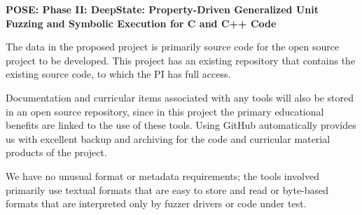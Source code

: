 \documentclass[12pt]{article}
\begin{document}

\begin{center}
  {\Large\sf\textbf{POSE: Phase II: DeepState: Property-Driven Generalized Unit Fuzzing and Symbolic Execution for C and C++ Code}}
\end{center}

The data in the proposed project is primarily source code for the open
source project to be developed.  This project has an existing
repository that contains the existing source code, to which the PI has
full access.

Documentation and curricular items associated with any tools will also be stored in
an open source repository, since in this project the primary
educational benefits are linked to the use of these tools.  Using GitHub automatically provides us with excellent backup
and archiving for the code and curricular material products of the
project.

We have no unusual format or metadata requirements; the
tools involved primarily use textual formats that are easy to store
and read or byte-based formats that are interpreted only by fuzzer
drivers or code under test.
\end{document}
